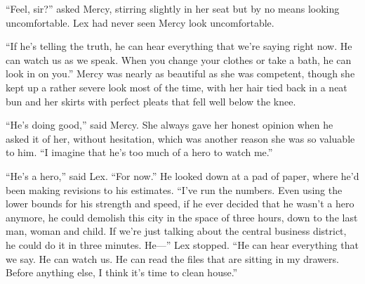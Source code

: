 ``Feel, sir?'' asked Mercy, stirring slightly in her seat but by no
means looking uncomfortable. Lex had never seen Mercy look
uncomfortable.

``If he's telling the truth, he can hear everything that we're saying
right now. He can watch us as we speak. When you change your clothes or
take a bath, he can look in on you.'' Mercy was nearly as beautiful as
she was competent, though she kept up a rather severe look most of the
time, with her hair tied back in a neat bun and her skirts with perfect
pleats that fell well below the knee.

``He's doing good,'' said Mercy. She always gave her honest opinion when
he asked it of her, without hesitation, which was another reason she was
so valuable to him. ``I imagine that he's too much of a hero to watch
me.''

``He's a hero,'' said Lex. ``For now.'' He looked down at a pad of
paper, where he'd been making revisions to his estimates. ``I've run the
numbers. Even using the lower bounds for his strength and speed, if he
ever decided that he wasn't a hero anymore, he could demolish this city
in the space of three hours, down to the last man, woman and child. If
we're just talking about the central business district, he could do it
in three minutes. He---'' Lex stopped. ``He can hear everything that we
say. He can watch us. He can read the files that are sitting in my
drawers. Before anything else, I think it's time to clean house.''
